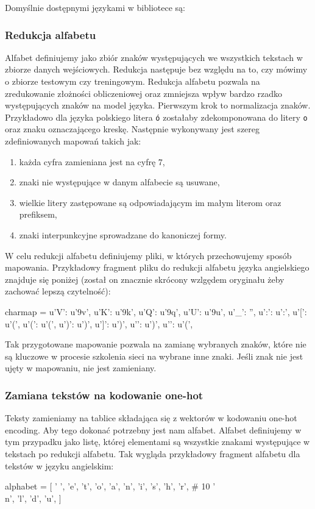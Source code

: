 Domyślnie dostępnymi językami w bibliotece są:
\languages 
 

\subsubsection{Redukcja alfabetu}
Alfabet definiujemy jako zbiór znaków występujących we wszystkich tekstach w zbiorze danych wejściowych.
Redukcja następuje bez względu na to, czy mówimy o zbiorze testowym czy treningowym.
Redukcja alfabetu pozwala na zredukowanie złożności obliczeniowej oraz zmniejsza wpływ bardzo rzadko
występujących znaków na model języka. Pierwszym krok to normalizacja znaków. 
Przykładowo dla języka polskiego litera \texttt{ó} zostałaby zdekomponowana do litery \texttt{o} oraz znaku oznaczającego kreskę.
Następnie wykonywany jest szereg zdefiniowanych mapowań takich jak:
\begin{enumerate}
  \item każda cyfra zamieniana jest na cyfrę 7,
  \item znaki nie występujące w danym alfabecie są usuwane,
  \item wielkie litery zastępowane są odpowiadającym im małym literom oraz prefiksem,
  \item znaki interpunkcyjne sprowadzane do kanoniczej formy.
\end{enumerate}
\newpage
W celu redukcji alfabetu definiujemy pliki, w których przechowujemy sposób mapowania. Przykładowy fragment pliku do redukcji alfabetu języka
angielskiego znajduje się poniżej (został on znacznie skrócony wzlgędem oryginału żeby zachować lepszą
czytelność):

\begin{python}
charmap = {
    u'V': u'\xb9v',     
    u'K': u'\xb9k',         
    u'Q': u'\xb9q',        
    u'U': u'\xb9u',   
    u'_': '',             
    u':': u':',             
    u'[': u'(',           
    u'(': u'(',               
    u')': u')',              
    u']': u')',              
    u'}': u')',              
    u'{': u'(',                 
}
\end{python}

Tak przygotowane mapowanie pozwala na zamianę wybranych znaków, które nie są kluczowe w procesie 
szkolenia sieci na wybrane inne znaki. Jeśli znak nie jest ujęty w mapowaniu, nie jest zamieniany. 

\subsubsection{Zamiana tekstów na kodowanie one-hot}
Teksty zamieniamy na tablice składająca się z wektorów w kodowaniu one-hot encoding. 
Aby tego dokonać potrzebny jest nam alfabet. Alfabet definiujemy w tym przypadku jako listę, której 
elementami są wszystkie znakami występujące w tekstach po redukcji alfabetu. Tak wygląda przykładowy fragment alfabetu dla tekstów
 w języku angielskim:
\begin{python}
alphabet = [
    ' ',
    'e',
    't',
    'o',
    'a',
    'n',
    'i',
    's',
    'h',
    'r',  # 10
    '\\n',
    'l',
    'd',
    'u',
]
\end{python}

